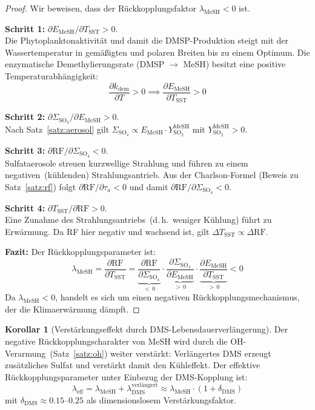 ﻿\documentclass[a4paper,12pt]{article}
\theoremstyle{definition}
\newtheorem{korollar}{Korollar}
\begin{document}
\begin{proof}
  Wir beweisen, dass der Rückkopplungsfaktor $\lambda_{\mathrm{MeSH}} < 0$ ist.

  \textbf{Schritt 1:} $\partial E_{\mathrm{MeSH}} / \partial T_{\mathrm{SST}} > 0$.\\
  Die Phytoplanktonaktivität und damit die DMSP-Produktion steigt mit der Wassertemperatur in
  gemäßigten und polaren Breiten bis zu einem Optimum. Die enzymatische Demethylierungsrate
  (DMSP $\rightarrow$ MeSH) besitzt eine positive Temperaturabhängigkeit:
  \[
    \frac{\partial k_{\mathrm{dem}}}{\partial T} > 0 \implies \frac{\partial E_{\mathrm{MeSH}}}{\partial T_{\mathrm{SST}}} > 0
  \]

  \textbf{Schritt 2:} $\partial \Sigma_{\mathrm{SO_4}} / \partial E_{\mathrm{MeSH}} > 0$.\\
  Nach Satz~\ref{satz:aerosol} gilt $\Sigma_{\mathrm{SO_4}} \propto E_{\mathrm{MeSH}} \cdot Y_{\mathrm{SO_2}}^{\mathrm{MeSH}}$ mit $Y_{\mathrm{SO_2}}^{\mathrm{MeSH}} > 0$.

  \textbf{Schritt 3:} $\partial \mathrm{RF} / \partial \Sigma_{\mathrm{SO_4}} < 0$.\\
  Sulfataerosole streuen kurzwellige Strahlung und führen zu einem negativen~(kühlenden)
  Strahlungsantrieb. Aus der Charlson-Formel (Beweis zu Satz~\ref{satz:rf}) folgt
  $\partial \mathrm{RF} / \partial \tau_a < 0$ und damit
  $\partial \mathrm{RF} / \partial \Sigma_{\mathrm{SO_4}} < 0$.

  \textbf{Schritt 4:} $\partial T_{\mathrm{SST}} / \partial \mathrm{RF} > 0$.\\
  Eine Zunahme des Strahlungsantriebs~(d.\,h.\ weniger Kühlung) führt zu Erwärmung. Da
  RF hier negativ und wachsend ist, gilt $\Delta T_{\mathrm{SST}} \propto \Delta\mathrm{RF}$.

  \textbf{Fazit:} Der Rückkopplungsparameter ist:
  \[
    \lambda_{\mathrm{MeSH}} = \frac{\partial \mathrm{RF}}{\partial T_{\mathrm{SST}}}
    = \underbrace{\frac{\partial \mathrm{RF}}{\partial \Sigma_{\mathrm{SO_4}}}}_{<\,0}
    \cdot \underbrace{\frac{\partial \Sigma_{\mathrm{SO_4}}}{\partial E_{\mathrm{MeSH}}}}_{>\,0}
    \cdot \underbrace{\frac{\partial E_{\mathrm{MeSH}}}{\partial T_{\mathrm{SST}}}}_{>\,0}
    < 0
  \]
  Da $\lambda_{\mathrm{MeSH}} < 0$, handelt es sich um einen negativen Rückkopplungsmechanismus,
  der die Klimaerwärmung dämpft. \qedhere
\end{proof}

\begin{korollar}[Verstärkungseffekt durch DMS-Lebensdauerverlängerung]
  Der negative Rückkopplungscharakter von MeSH wird durch die OH-Verarmung~(Satz~\ref{satz:oh})
  weiter verstärkt: Verlängertes DMS erzeugt zusätzliches Sulfat und verstärkt damit den
  Kühleffekt. Der effektive Rückkopplungsparameter unter Einbezug der DMS-Kopplung ist:
  \[
    \lambda_{\mathrm{eff}} = \lambda_{\mathrm{MeSH}} + \lambda_{\mathrm{DMS}}^{\mathrm{verlängert}}
    \approx \lambda_{\mathrm{MeSH}} \cdot (1 + \delta_{\mathrm{DMS}})
  \]
  mit $\delta_{\mathrm{DMS}} \approx 0.15$--$0.25$ als dimensionslosem Verstärkungsfaktor.
\end{korollar}
\end{document}
